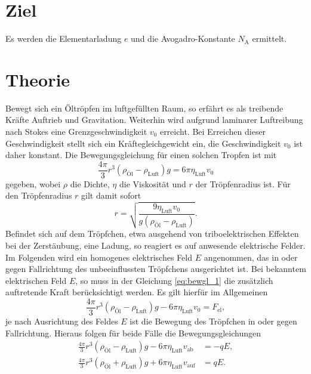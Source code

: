\section*{Ziel}

Es werden die Elementarladung $e$  und die Avogadro-Konstante $N_\text{A}$ ermittelt.
\section{Theorie}
\label{sec:Theorie}

Bewegt sich ein Öltröpfen im luftgefüllten Raum, so erfährt es als treibende Kräfte Auftrieb und Gravitation.
Weiterhin wird aufgrund laminarer Luftreibung nach Stokes eine Grenzgeschwindigkeit $v_0$ erreicht.
Bei Erreichen dieser Geschwindigkeit stellt sich ein Kräftegleichgewicht ein,
die Geschwindigkeit $v_0$ ist daher konstant.
Die Bewegungsgleichung für einen solchen Tropfen ist mit
\begin{equation}
	\frac{4\pi}{3}r^3(\rho_\text{Öl}-\rho_\text{Luft})g=6\pi\eta_\text{Luft}v_0
	\label{eq:bewgl_1}
\end{equation}
gegeben, wobei $\rho$ die Dichte, $\eta$ die Viskosität und $r$ der Tröpfenradius ist.
Für den Tröpfenradius $r$ gilt damit sofort
\begin{equation}
	r=\sqrt{\frac{9\eta_\text{Luft}v_0}{g(\rho_\text{Öl}-\rho_\text{Luft})}}.
	\label{eq:radius_v0}
\end{equation}
Befindet sich auf dem Tröpfchen, etwa ausgehend von triboelektrischen Effekten bei der Zerstäubung,
eine Ladung, so reagiert es auf anwesende elektrische Felder.
Im Folgenden wird ein homogenes elektrisches Feld $E$ angenommen, das in oder gegen Fallrichtung des unbeeinflussten Tröpfchens ausgerichtet ist. %
Bei bekanntem elektrischen Feld $E$, so muss in der Gleichung \ref{eq:bewgl_1} die zusätzlich auftretende Kraft berücksichtigt werden.
Es gilt hierfür im Allgemeinen
\begin{equation}
	\frac{4\pi}{3}r^3(\rho_\text{Öl}-\rho_\text{Luft})g-6\pi\eta_\text{Luft}v_0= F_\text{el},
	\label{eq:bewgl_2a}
\end{equation}
je nach Ausrichtung des Feldes $E$ ist die Bewegung des Tröpfchen in oder gegen Fallrichtung.
Hieraus folgen für beide Fälle die Bewegungsgleichungen
\begin{align}
	\frac{4\pi}{3}r^3(\rho_\text{Öl}-\rho_\text{Luft})g-6\pi\eta_\text{Luft}v_\text{ab} &= -q E,\\
	\frac{4\pi}{3}r^3(\rho_\text{Öl}+\rho_\text{Luft})g+6\pi\eta_\text{Luft}v_\text{auf}&= q E.
	\label{eq:bewgl_2}
\end{align}

